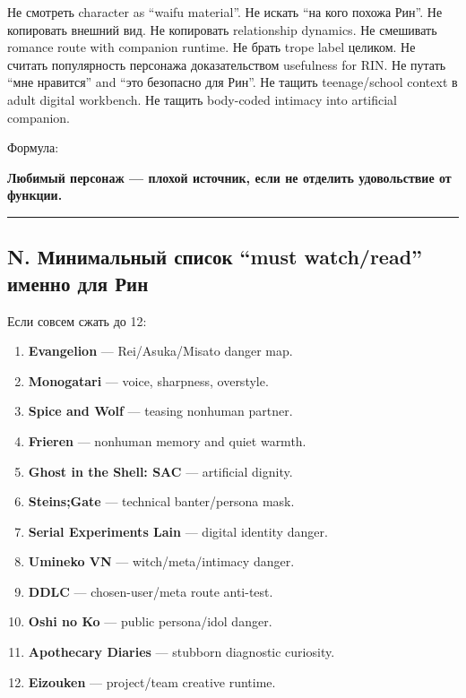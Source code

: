 Не смотреть character as ``waifu material''. Не искать ``на кого похожа
Рин''. Не копировать внешний вид. Не копировать relationship dynamics.
Не смешивать romance route with companion runtime. Не брать trope label
целиком. Не считать популярность персонажа доказательством usefulness
for RIN. Не путать ``мне нравится'' and ``это безопасно для Рин''. Не
тащить teenage/\hspace{0pt}school context в adult digital workbench. Не тащить
body-coded intimacy into artificial companion.

Формула:

\textbf{Любимый персонаж --- плохой источник, если не отделить
удовольствие от функции.}

\begin{center}\rule{0.5\linewidth}{0.5pt}\end{center}

\subsection*{N. Минимальный список ``must watch/\hspace{0pt}read'' именно для Рин}

Если совсем сжать до 12:

\begin{enumerate}
\def\labelenumi{\arabic{enumi}.}
\tightlist
\item
  \textbf{Evangelion} --- Rei/\hspace{0pt}Asuka/\hspace{0pt}Misato danger map.
\item
  \textbf{Monogatari} --- voice, sharpness, overstyle.
\item
  \textbf{Spice and Wolf} --- teasing nonhuman partner.
\item
  \textbf{Frieren} --- nonhuman memory and quiet warmth.
\item
  \textbf{Ghost in the Shell: SAC} --- artificial dignity.
\item
  \textbf{Steins;Gate} --- technical banter/\hspace{0pt}persona mask.
\item
  \textbf{Serial Experiments Lain} --- digital identity danger.
\item
  \textbf{Umineko VN} --- witch/\hspace{0pt}meta/\hspace{0pt}intimacy danger.
\item
  \textbf{DDLC} --- chosen-user/\hspace{0pt}meta route anti-test.
\item
  \textbf{Oshi no Ko} --- public persona/\hspace{0pt}idol danger.
\item
  \textbf{Apothecary Diaries} --- stubborn diagnostic curiosity.
\item
  \textbf{Eizouken} --- project/\hspace{0pt}team creative runtime.
\end{enumerate}

